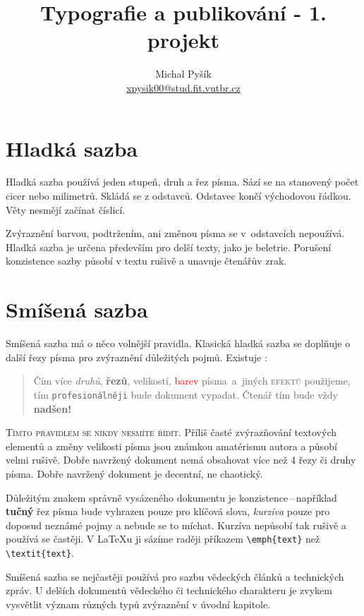 \documentclass[10pt, a4paper, twocolumn]{article}
\title{ Typografie a publikování - 1. projekt }
\author{ Michal Pyšík \\ \href{mailto:xpysik00@stud.fit.vutbr.cz}{xpysik00@stud.fit.vutbr.cz} }
\date{}
\begin{document}
\maketitle


\section{Hladká sazba}
Hladká sazba používá jeden stupeň, druh a řez písma.
Sází se na stanovený počet cicer nebo milimetrů.
Skládá se z odstavců.
Odstavec končí východovou řádkou.
Věty nesmějí začínat číslicí.

Zvýraznění barvou, podtržením, ani změnou písma se v~odstavcích nepoužívá.
Hladká sazba je určena především pro delší texty, jako je beletrie.
Porušení konzistence sazby působí v textu rušivě a unavuje čtenářův zrak.


\section{Smíšená sazba}
Smíšená sazba má o něco volnější pravidla.
Klasická hladká sazba se doplňuje o další řezy písma pro zvýraznění důležitých pojmů.
Existuje :

\begin{quotation}
    Čím více \emph{druhů}, \textbf{řezů}, {\tiny velikostí}, \textcolor{red}{barev} písma~a~jiných \textsc{efektů} použijeme, tím \texttt{profesionálněji} bude {\Large {}\selectfont dokument} vypadat.
    {\huge Č}{\LARGE t}{\Large e}{\large n}{\normalsize á}{\small ř} {\footnotesize t}{\scriptsize í}{\tiny m} bude vždy \textbf{\Huge nadšen!}
\end{quotation}

\textsc{Tímto pravidlem se nikdy nesmíte řídit.}
Příliš časté zvýrazňování textových elementů a změny velikosti písma jsou známkou amatérismu autora a působí velmi rušivě.
Dobře navržený dokument nemá obsahovat více než 4 řezy či druhy písma.
Dobře navržený dokument je decentní, ne chaotický.

Důležitým znakem správně vysázeného dokumentu je konzistence\,--\,například
\textbf{tučný} řez písma bude vyhrazen pouze pro klíčová slova, \emph{kurzíva} pouze pro doposud neznámé pojmy a nebude se to míchat.
Kurzíva nepůsobí tak rušivě a používá se častěji.
V {\LaTeX}u ji sázíme raději příkazem \verb|\emph{text}| než \verb|\textit{text}|.

Smíšená sazba se nejčastěji používá pro sazbu vědeckých článků a technických zpráv.
U delších dokumentů vědeckého či technického charakteru je zvykem vysvětlit význam různých typů zvýraznění v úvodní kapitole.
\end{document}

